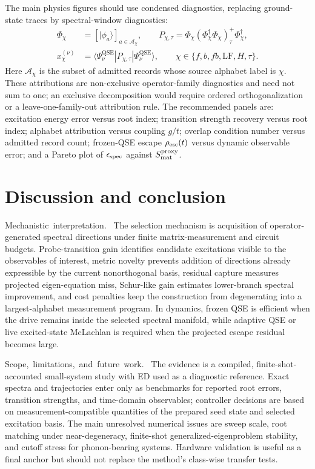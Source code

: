 \documentclass[
  reprint,
  amsmath,
  amssymb,
  aps,
  pra,
  nofootinbib,
  superscriptaddress,
  floatfix
]{revtex4-2}
\newcommand{\tentative}[1]{\textcolor{red!70!black}{#1}}
\newcommand{\structlabel}[1]{\noindent\mbox{\tentative{#1.}}~}
\newcommand{\Acal}{\mathcal{A}}
\newcommand{\qse}{\mathrm{QSE}}
\newcommand{\lf}{\mathrm{LF}}
\newcommand{\ket}[1]{|#1\rangle}
\newcommand{\bra}[1]{\langle #1|}
\begin{document}
The main physics figures should use condensed diagnostics, replacing ground-state traces by spectral-window diagnostics:
\begin{equation}
\begin{aligned}
\Phi_\chi&=[\ket{\phi_a}]_{a\in\Acal_\chi},
\qquad
P_{\chi,\tau}
=
\Phi_\chi(\Phi_\chi^\dagger\Phi_\chi)_\tau^+\Phi_\chi^\dagger,
\\
x_\chi^{(\nu)}
&=
\bra{\Psi_\nu^{\qse}}
P_{\chi,\tau}
\ket{\Psi_\nu^{\qse}},
\qquad
\chi\in\{f,b,fb,\lf,H,\tau\}.
\end{aligned}
\label{eq:alphabet_attribution}
\end{equation}
Here $\Acal_\chi$ is the subset of admitted records whose source alphabet label is $\chi$.  These attributions are non-exclusive operator-family diagnostics and need not sum to one; an exclusive decomposition would require ordered orthogonalization or a leave-one-family-out attribution rule.
The recommended panels are: excitation energy error versus root index; transition strength recovery versus root index; alphabet attribution versus coupling $g/t$; overlap condition number versus admitted record count; frozen-QSE escape $\rho_{\rm esc}(t)$ versus dynamic observable error; and a Pareto plot of $\epsilon_{\rm spec}$ against $S_{\rm mat}^{\rm proxy}$.

\section{Discussion and conclusion}
\label{sec:discussion}
\label{sec:conclusion}

\structlabel{Mechanistic interpretation}
The selection mechanism is acquisition of operator-generated spectral directions under finite matrix-measurement and circuit budgets.  Probe-transition gain identifies candidate excitations visible to the observables of interest, metric novelty prevents addition of directions already expressible by the current nonorthogonal basis, residual capture measures projected eigen-equation miss, Schur-like gain estimates lower-branch spectral improvement, and cost penalties keep the construction from degenerating into a largest-alphabet measurement program.  In dynamics, frozen QSE is efficient when the drive remains inside the selected spectral manifold, while adaptive QSE or live excited-state McLachlan is required when the projected escape residual becomes large.

\structlabel{Scope, limitations, and future work}
The evidence is a compiled, finite-shot-accounted small-system study with ED used as a diagnostic reference.  Exact spectra and trajectories enter only as benchmarks for reported root errors, transition strengths, and time-domain observables; controller decisions are based on measurement-compatible quantities of the prepared seed state and selected excitation basis.  The main unresolved numerical issues are sweep scale, root matching under near-degeneracy, finite-shot generalized-eigenproblem stability, and cutoff stress for phonon-bearing systems.  Hardware validation is useful as a final anchor but should not replace the method's class-wise transfer tests.
\end{document}
